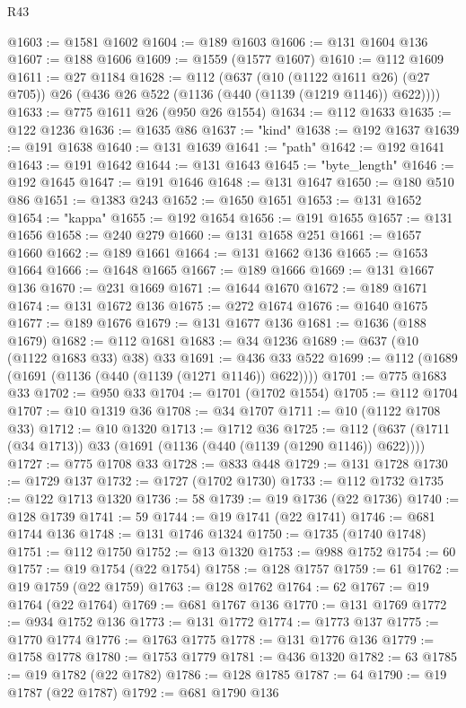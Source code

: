 \begin{lexlean}{R43}
\begin{coremodule}
@1603 := @1581 @1602
@1604 := @189 @1603
@1606 := @131 @1604 @136
@1607 := @188 @1606
@1609 := @1559 (@1577 @1607)
@1610 := @112 @1609
@1611 := @27 @1184
@1628 := @112
    (@637
      (@10 (@1122 @1611 @26) (@27 @705))
      @26
      (@436 @26 @522 (@1136 (@440 (@1139 (@1219 @1146)) @622))))
@1633 := @775 @1611 @26 (@950 @26 @1554)
@1634 := @112 @1633
@1635 := @122 @1236
@1636 := @1635 @86
@1637 := "kind"
@1638 := @192 @1637
@1639 := @191 @1638
@1640 := @131 @1639
@1641 := "path"
@1642 := @192 @1641
@1643 := @191 @1642
@1644 := @131 @1643
@1645 := "byte_length"
@1646 := @192 @1645
@1647 := @191 @1646
@1648 := @131 @1647
@1650 := @180 @510 @86
@1651 := @1383 @243
@1652 := @1650 @1651
@1653 := @131 @1652
@1654 := "kappa"
@1655 := @192 @1654
@1656 := @191 @1655
@1657 := @131 @1656
@1658 := @240 @279
@1660 := @131 @1658 @251
@1661 := @1657 @1660
@1662 := @189 @1661
@1664 := @131 @1662 @136
@1665 := @1653 @1664
@1666 := @1648 @1665
@1667 := @189 @1666
@1669 := @131 @1667 @136
@1670 := @231 @1669
@1671 := @1644 @1670
@1672 := @189 @1671
@1674 := @131 @1672 @136
@1675 := @272 @1674
@1676 := @1640 @1675
@1677 := @189 @1676
@1679 := @131 @1677 @136
@1681 := @1636 (@188 @1679)
@1682 := @112 @1681
@1683 := @34 @1236
@1689 := @637 (@10 (@1122 @1683 @33) @38) @33
@1691 := @436 @33 @522
@1699 := @112 (@1689 (@1691 (@1136 (@440 (@1139 (@1271 @1146)) @622))))
@1701 := @775 @1683 @33
@1702 := @950 @33
@1704 := @1701 (@1702 @1554)
@1705 := @112 @1704
@1707 := @10 @1319 @36
@1708 := @34 @1707
@1711 := @10 (@1122 @1708 @33)
@1712 := @10 @1320
@1713 := @1712 @36
@1725 := @112 (@637 (@1711 (@34 @1713)) @33 (@1691 (@1136 (@440 (@1139 (@1290 @1146)) @622))))
@1727 := @775 @1708 @33
@1728 := @833 @448
@1729 := @131 @1728
@1730 := @1729 @137
@1732 := @1727 (@1702 @1730)
@1733 := @112 @1732
@1735 := @122 @1713 @1320
@1736 := 58
@1739 := @19 @1736 (@22 @1736)
@1740 := @128 @1739
@1741 := 59
@1744 := @19 @1741 (@22 @1741)
@1746 := @681 @1744 @136
@1748 := @131 @1746 @1324
@1750 := @1735 (@1740 @1748)
@1751 := @112 @1750
@1752 := @13 @1320
@1753 := @988 @1752
@1754 := 60
@1757 := @19 @1754 (@22 @1754)
@1758 := @128 @1757
@1759 := 61
@1762 := @19 @1759 (@22 @1759)
@1763 := @128 @1762
@1764 := 62
@1767 := @19 @1764 (@22 @1764)
@1769 := @681 @1767 @136
@1770 := @131 @1769
@1772 := @934 @1752 @136
@1773 := @131 @1772
@1774 := @1773 @137
@1775 := @1770 @1774
@1776 := @1763 @1775
@1778 := @131 @1776 @136
@1779 := @1758 @1778
@1780 := @1753 @1779
@1781 := @436 @1320
@1782 := 63
@1785 := @19 @1782 (@22 @1782)
@1786 := @128 @1785
@1787 := 64
@1790 := @19 @1787 (@22 @1787)
@1792 := @681 @1790 @136

\end{coremodule}
\end{lexlean}

